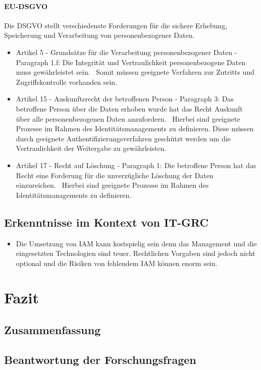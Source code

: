 \documentclass[12pt]{article}
\begin{document}
\paragraph{EU-DSGVO}
Die DSGVO stellt verschiedenste Forderungen für die sichere Erhebung, Speicherung und Verarbeitung von personenbezogener Daten.~\cite{Hindle_2020}
\begin{itemize}
  \item Artikel 5 - Grundsätze für die Verarbeitung personenbezogener Daten - Paragraph 1.f: Die Integrität und Vertraulichkeit personenbezogene Daten muss gewährleistet sein.~\cite{eu2016} Somit müssen geeignete Verfahren zur Zutritts und Zugriffskontrolle vorhanden sein.
  \item Artikel 15 - Auskunftsrecht der betroffenen Person - Paragraph 3: Das betroffene Person über die Daten erhoben wurde hat das Recht Auskunft über alle personenbezogenen Daten anzufordern.~\cite{eu2016} Hierbei sind geeignete Prozesse im Rahmen des Identitätsmanagements zu definieren. Diese müssen durch geeignete Authentifizierungsverfahren geschützt werden um die Vertraulichkeit der Weitergabe zu gewährleisten.
  \item Artikel 17 - Recht auf Löschung - Paragraph 1: Die betroffene Person hat das Recht eine Forderung für die unverzügliche Löschung der Daten einzureichen.~\cite{eu2016} Hierbei sind geeignete Prozesse im Rahmen des Identitätsmanagements zu definieren.
\end{itemize}
\subsection{Erkenntnisse im Kontext von IT-GRC}
\begin{itemize}
  \item Die Umsetzung von IAM kann kostspielig sein denn das Management und die eingesetzten Technologien sind teuer. Rechtlichen Vorgaben sind jedoch nicht optional und die Risiken von fehlendem IAM können enorm sein.
\end{itemize}
\section{Fazit}
\subsection{Zusammenfassung}
\subsection{Beantwortung der Forschungsfragen}
\end{document}
